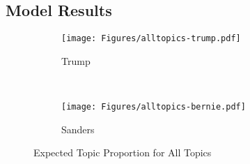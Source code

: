 \documentclass[12pt]{article}
\begin{document}
\begin{appendices}
\begin{refsection}
\clearpage
\subsection{Model Results}\label{app:stmresults}

\begin{figure}[bp!]
\centering
   \begin{subfigure}[b]{0.7\textwidth}
	   \centering
	   \texttt{[image: Figures/alltopics-trump.pdf]}
	   \caption{Trump}
	   \label{fig:alltopics-trump} 
	\end{subfigure}
\\
	\begin{subfigure}[b]{0.7\textwidth}
		\centering
	   \texttt{[image: Figures/alltopics-bernie.pdf]} 
	   \caption{Sanders}
	   \label{fig:alltopics-sanders}
	\end{subfigure}
	\caption{Expected Topic Proportion for All Topics}\label{fig:alltopics}
\end{figure}







\end{refsection}
\end{appendices}
\end{document}

